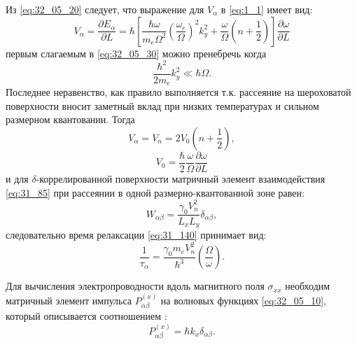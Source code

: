 Из \eqref{eq:32_05_20} следует, что выражение для $ V_{\alpha}$ в \eqref{eq:1_1} имеет вид:
\begin{equation} \label{eq:32_05_30}
V_{\alpha} = \frac{\partial E_{\alpha }}{\partial L}=\hbar \left[\frac{\hbar\omega}{m_e \Omega^2} {\left(\frac{\omega_c}{\Omega }\right)}^2 k^2_y+\frac{\omega}{\Omega} \left(n+\frac{1}{2}\right)\right] \frac{\partial\omega}{\partial L}
\end{equation}
первым слагаемым в \eqref{eq:32_05_30} можно пренебречь когда
\[
\frac{\hbar^2}{2m_e}k^2_y \ll \hbar \Omega.
\]
Последнее неравенство, как правило выполняется т.к. рассеяние на шероховатой поверхности вносит заметный вклад при низких температурах и сильном размерном квантовании. Тогда
\begin{equation} \label{eq:32_05_40}
V_{\alpha} = V_n = 2 V_0 \left(n+\frac{1}{2}\right),
\end{equation}
\begin{equation} \label{eq:32_05_42}
V_0 = \frac{\hbar}{2} \frac{\omega}{\Omega} \frac{\partial\omega}{\partial L}
\end{equation}
и для $\delta$-коррелированной поверхности матричный элемент взаимодействия \eqref{eq:31_85} при рассеянии в одной размерно-квантованной зоне равен:
\begin{equation} \label{eq:32_05_50}
W_{\alpha \beta }=\frac{\gamma_0 V^2_n}{L_x L_y} \delta_{\alpha \beta},
\end{equation}
следовательно время релаксации \eqref{eq:31_140} принимает вид:
\begin{equation} \label{eq:32_05_60}
\frac{1}{\tau_{\alpha }}=\frac{\gamma_0 m_e V_n^2}{\hbar^3}\left(\frac{\Omega }{\omega }\right).
\end{equation}

Для вычисления электропроводности вдоль магнитного поля $\sigma_{xx}$ необходим матричный элемент импульса $P^{(x)}_{\alpha\beta}$ на волновых функциях \eqref{eq:32_05_10}, который описывается соотношением \cite{Sinyavskii1998}:
\begin{equation} \label{eq:32_05_70}
P^{(x)}_{\alpha\beta} =\hbar k_x \delta_{\alpha\beta}.
\end{equation}

